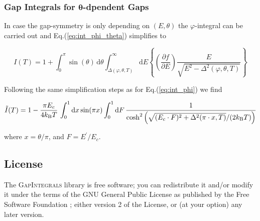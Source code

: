 \documentclass[twoside]{article}
\newcommand{\gapint}{\textsc{GapIntegrals}\xspace}
\begin{document}
\subsubsection*{Gap Integrals for $\bm{\theta}$-dpendent Gaps}%

\noindent In case the gap-symmetry is only depending on $(E,\theta)$ the $\varphi$-integral can be carried out and Eq.(\ref{eq:int_phi_theta}) simplifies to

\begin{equation}\label{eq:int_theta}
  I(T) = 1 + \int_0^\pi \sin(\theta)\, \mathrm{d}\theta \int_{\Delta(\varphi,\theta,T)}^\infty \mathrm{d}E \left\{ \left(\frac{\partial f}{\partial E}\right) \frac{E}{\sqrt{E^2 - \Delta^2(\varphi, \theta, T)}} \right\}
\end{equation}

\noindent Following the same simplification steps as for Eq.(\ref{eq:int_phi}) we find

\begin{equation}\label{eq:int_tilde_theta}
 \tilde{I}(T) = 1 - \frac{\pi E_c}{4 k_{\rm B}T}\, \int_0^1 \mathrm{d}x \sin(\pi x) \int_0^1 \mathrm{d}F\, \frac{1}{\cosh^2\left(\sqrt{(E_c\cdot F)^2 + \Delta^2(\pi\cdot x, T)}/(2 k_{\rm B} T)\right)}   
\end{equation}

\noindent where $x = \theta / \pi$, and $F = E^\prime / E_c$.

\subsection*{License}
The \gapint library is free software; you can redistribute it and/or modify it under the terms of the GNU General Public License as published by the Free Software Foundation \cite{GPL}; either version 2 of the License, or (at your option) any later version.
\end{document}
